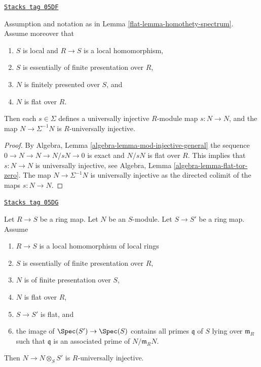 \begin{lemma}
\label{flat-lemma-homothety-universally-injective}
\href{https://stacks.math.columbia.edu/tag/05DF}{\texttt{Stacks tag 05DF}}

Assumption and notation as in
Lemma \ref{flat-lemma-homothety-spectrum}.
Assume moreover that
\begin{enumerate}
\item $S$ is local and $R \to S$ is a local homomorphism,
\item $S$ is essentially of finite presentation over $R$,
\item $N$ is finitely presented over $S$, and
\item $N$ is flat over $R$.
\end{enumerate}
Then each $s \in \Sigma$ defines a
universally injective $R$-module map $s : N \to N$, and the
map $N \to \Sigma^{-1}N$ is $R$-universally injective.
\end{lemma}

\begin{proof}
By
Algebra, Lemma \ref{algebra-lemma-mod-injective-general}
the sequence $0 \to N \to N \to N/sN \to 0$ is exact and
$N/sN$ is flat over $R$. This implies that $s : N \to N$
is universally injective, see
Algebra, Lemma \ref{algebra-lemma-flat-tor-zero}.
The map $N \to \Sigma^{-1}N$ is universally injective as the directed
colimit of the maps $s : N \to N$.
\end{proof}

\begin{lemma}
\label{flat-lemma-base-change-universally-flat-local}
\href{https://stacks.math.columbia.edu/tag/05DG}{\texttt{Stacks tag 05DG}}

Let $R \to S$ be a ring map.
Let $N$ be an $S$-module.
Let $S \to S'$ be a ring map.
Assume
\begin{enumerate}
\item $R \to S$ is a local homomorphism of local rings
\item $S$ is essentially of finite presentation over $R$,
\item $N$ is of finite presentation over $S$,
\item $N$ is flat over $R$,
\item $S \to S'$ is flat, and
\item the image of $\Spec(S') \to \Spec(S)$ contains
all primes $\mathfrak q$ of $S$ lying over $\mathfrak m_R$
such that $\mathfrak q$ is an associated prime of $N/\mathfrak m_R N$.
\end{enumerate}
Then $N \to N \otimes_S S'$ is $R$-universally injective.
\end{lemma}

